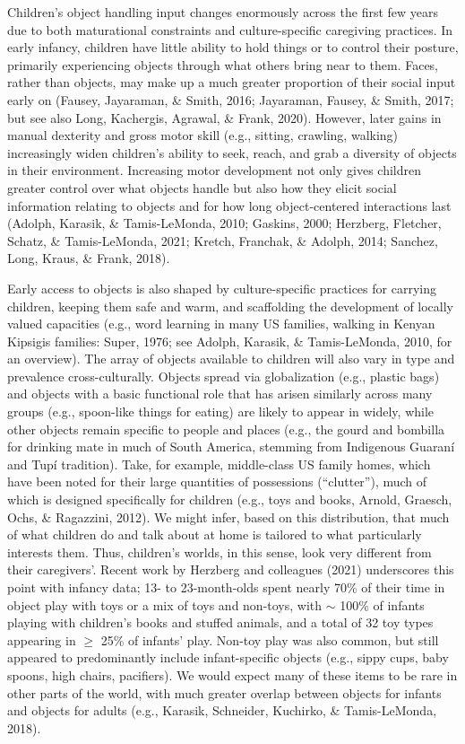 \documentclass[10pt, letterpaper]{article}
\begin{document}
Children's object handling input changes enormously across the first few
years due to both maturational constraints and culture-specific
caregiving practices. In early infancy, children have little ability to
hold things or to control their posture, primarily experiencing objects
through what others bring near to them. Faces, rather than objects, may
make up a much greater proportion of their social input early on
(Fausey, Jayaraman, \& Smith, 2016; Jayaraman, Fausey, \& Smith, 2017;
but see also Long, Kachergis, Agrawal, \& Frank, 2020). However, later
gains in manual dexterity and gross motor skill (e.g., sitting,
crawling, walking) increasingly widen children's ability to seek, reach,
and grab a diversity of objects in their environment. Increasing motor
development not only gives children greater control over what objects
handle but also how they elicit social information relating to objects
and for how long object-centered interactions last (Adolph, Karasik, \&
Tamis-LeMonda, 2010; Gaskins, 2000; Herzberg, Fletcher, Schatz, \&
Tamis-LeMonda, 2021; Kretch, Franchak, \& Adolph, 2014; Sanchez, Long,
Kraus, \& Frank, 2018).

Early access to objects is also shaped by culture-specific practices for
carrying children, keeping them safe and warm, and scaffolding the
development of locally valued capacities (e.g., word learning in many US
families, walking in Kenyan Kipsigis families: Super, 1976; see Adolph,
Karasik, \& Tamis-LeMonda, 2010, for an overview). The array of objects
available to children will also vary in type and prevalence
cross-culturally. Objects spread via globalization (e.g., plastic bags)
and objects with a basic functional role that has arisen similarly
across many groups (e.g., spoon-like things for eating) are likely to
appear in widely, while other objects remain specific to people and
places (e.g., the gourd and bombilla for drinking mate in much of South
America, stemming from Indigenous Guaraní and Tupí tradition). Take, for
example, middle-class US family homes, which have been noted for their
large quantities of possessions (``clutter''), much of which is designed
specifically for children (e.g., toys and books, Arnold, Graesch, Ochs,
\& Ragazzini, 2012). We might infer, based on this distribution, that
much of what children do and talk about at home is tailored to what
particularly interests them. Thus, children's worlds, in this sense,
look very different from their caregivers'. Recent work by Herzberg and
colleagues (2021) underscores this point with infancy data; 13- to
23-month-olds spent nearly 70\% of their time in object play with toys
or a mix of toys and non-toys, with \(\sim\) 100\% of infants playing
with children's books and stuffed animals, and a total of 32 toy types
appearing in \(\ge\) 25\% of infants' play. Non-toy play was also
common, but still appeared to predominantly include infant-specific
objects (e.g., sippy cups, baby spoons, high chairs, pacifiers). We
would expect many of these items to be rare in other parts of the world,
with much greater overlap between objects for infants and objects for
adults (e.g., Karasik, Schneider, Kuchirko, \& Tamis-LeMonda, 2018).
\end{document}
